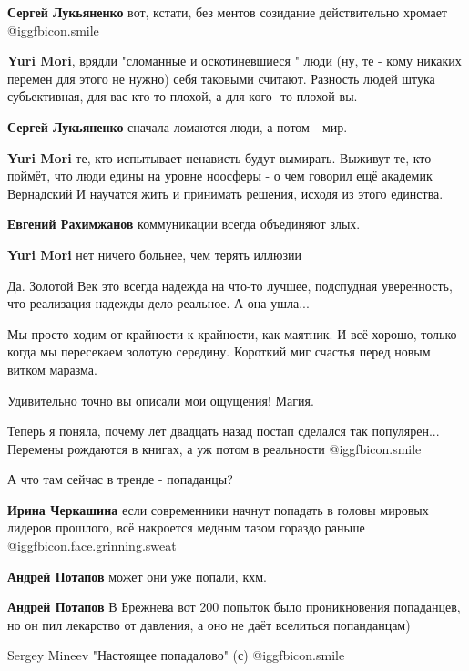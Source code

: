 \begin{itemize}
\begin{itemize}
\textbf{Сергей Лукьяненко} вот, кстати, без ментов созидание действительно хромает  @igg{fbicon.smile} 

\textbf{Yuri Mori}, врядли "сломанные и оскотиневшиеся " люди (ну, те - кому никаких перемен для этого не нужно) себя таковыми считают. Разность людей штука субьективная, для вас кто-то плохой, а для кого- то плохой вы.

\textbf{Сергей Лукьяненко} сначала ломаются люди, а потом - мир.

\textbf{Yuri Mori} те, кто испытывает ненависть будут вымирать. Выживут те, кто поймёт, что люди едины на уровне ноосферы - о чем говорил ещё академик Вернадский
И научатся жить и принимать решения, исходя из этого единства.

\textbf{Евгений Рахимжанов} коммуникации всегда объединяют злых.

\textbf{Yuri Mori} нет ничего больнее, чем терять иллюзии
\end{itemize} %


Да. Золотой Век это всегда надежда на что-то лучшее, подспудная уверенность,
что реализация надежды дело реальное. А она ушла...



Мы просто ходим от крайности к крайности, как маятник. И всё хорошо, только
когда мы пересекаем золотую середину. Короткий миг счастья перед новым витком
маразма.

Удивительно точно вы описали мои ощущения! Магия.


Теперь я поняла, почему лет двадцать назад постап сделался так популярен...
Перемены рождаются в книгах, а уж потом в реальности  @igg{fbicon.smile} 

А что там сейчас в тренде - попаданцы?

\begin{itemize} %
\textbf{Ирина Черкашина} если современники начнут попадать в головы мировых лидеров прошлого, всё накроется медным тазом гораздо раньше  @igg{fbicon.face.grinning.sweat} 

\textbf{Андрей Потапов} может они уже попали, кхм.

\textbf{Андрей Потапов} В Брежнева вот 200 попыток было проникновения попаданцев, но он пил лекарство от давления, а оно не даёт вселиться попанданцам)

Sergey Mineev "Настоящее попадалово" (с)  @igg{fbicon.smile} 

\end{itemize} %


\end{itemize} %
